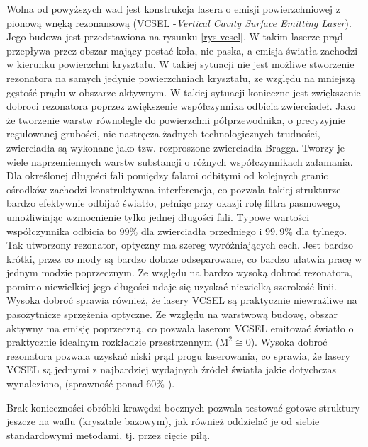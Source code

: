 \documentclass[a4paper,10pt,twoside]{report}
\begin{document}
Wolna od powyższych wad jest konstrukcja lasera o emisji powierzchniowej z pionową wnęką rezonansową (VCSEL -\textit{Vertical Cavity Surface Emitting Laser}). Jego budowa jest przedstawiona na rysunku \ref{rys-vcsel}. W takim laserze prąd przepływa przez obszar mający postać koła, nie paska, a emisja światła zachodzi w kierunku powierzchni kryształu. W takiej sytuacji nie jest możliwe stworzenie rezonatora na samych jedynie powierzchniach kryształu, ze względu na mniejszą gęstość prądu w obszarze aktywnym. W takiej sytuacji konieczne jest zwiększenie dobroci rezonatora poprzez zwiększenie współczynnika odbicia zwierciadeł. Jako że tworzenie warstw równolegle do powierzchni półprzewodnika, o precyzyjnie regulowanej grubości, nie nastręcza żadnych technologicznych trudności, zwierciadła są wykonane jako tzw. rozproszone zwierciadła Bragga. Tworzy je wiele naprzemiennych warstw substancji o różnych współczynnikach załamania. Dla określonej długości fali pomiędzy falami odbitymi od kolejnych granic ośrodków zachodzi konstruktywna interferencja, co pozwala takiej strukturze bardzo efektywnie odbijać światło, pełniąc przy okazji rolę filtra pasmowego, umożliwiając wzmocnienie tylko jednej długości fali. Typowe wartości współczynnika odbicia to $99\%$ dla zwierciadła przedniego i $99{,}9\%$ dla tylnego. Tak utworzony rezonator, optyczny ma szereg wyróżniających cech. Jest bardzo krótki, przez co mody są bardzo dobrze odseparowane, co bardzo ułatwia pracę w jednym modzie poprzecznym. Ze względu na bardzo wysoką dobroć rezonatora, pomimo niewielkiej jego długości udaje się uzyskać niewielką szerokość linii. Wysoka dobroć sprawia również, że lasery VCSEL są praktycznie niewrażliwe na pasożytnicze sprzężenia optyczne.
Ze względu na warstwową budowę, obszar aktywny ma emisję poprzeczną, co pozwala laserom VCSEL emitować światło o praktycznie idealnym rozkładzie przestrzennym ($\mathrm{M^2} \cong 0$). Wysoka dobroć rezonatora pozwala uzyskać niski prąd progu laserowania, co sprawia, że lasery VCSEL są jednymi z najbardziej wydajnych źródeł światła jakie dotychczas wynaleziono, (sprawność ponad 60\% \cite{spie}). 

Brak konieczności obróbki krawędzi bocznych pozwala testować gotowe struktury jeszcze na waflu (krysztale bazowym), jak również oddzielać je od siebie standardowymi metodami, tj. przez cięcie piłą. 
\end{document}
